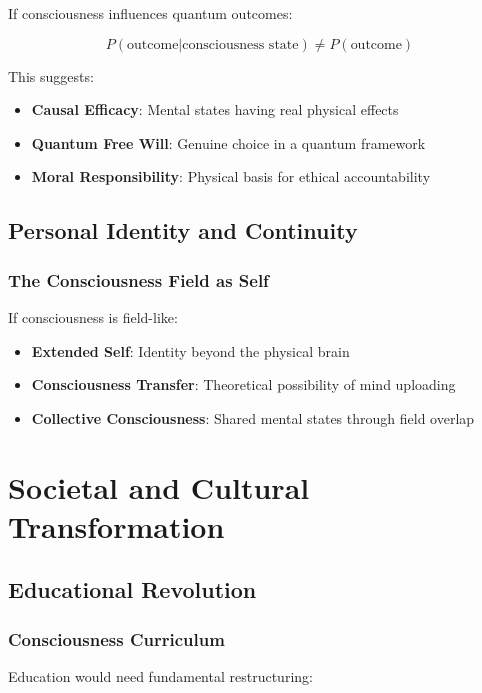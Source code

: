 \documentclass[12pt,article]{memoir}
\begin{document}
If consciousness influences quantum outcomes:

\begin{equation}
P(\text{outcome}|\text{consciousness state}) \neq P(\text{outcome})
\end{equation}

This suggests:
\begin{itemize}
    \item \textbf{Causal Efficacy}: Mental states having real physical effects
    \item \textbf{Quantum Free Will}: Genuine choice in a quantum framework
    \item \textbf{Moral Responsibility}: Physical basis for ethical accountability
\end{itemize}

\section{Personal Identity and Continuity}

\subsection{The Consciousness Field as Self}

If consciousness is field-like:
\begin{itemize}
    \item \textbf{Extended Self}: Identity beyond the physical brain
    \item \textbf{Consciousness Transfer}: Theoretical possibility of mind uploading
    \item \textbf{Collective Consciousness}: Shared mental states through field overlap
\end{itemize}

\chapter{Societal and Cultural Transformation}

\section{Educational Revolution}

\subsection{Consciousness Curriculum}

Education would need fundamental restructuring:
\end{document}
